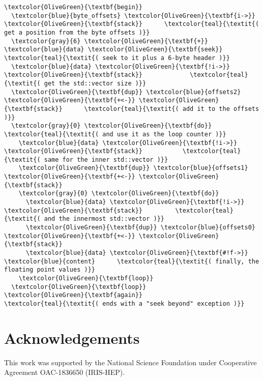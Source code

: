 \documentclass{webofc}
\begin{document}
\begin{Verbatim}[commandchars=\\\{\}]
\textcolor{OliveGreen}{\textbf{begin}}
  \textcolor{blue}{byte_offsets} \textcolor{OliveGreen}{\textbf{i->}} \textcolor{OliveGreen}{\textbf{stack}}      \textcolor{teal}{\textit{( get a position from the byte offsets )}}
  \textcolor{gray}{6} \textcolor{OliveGreen}{\textbf{+}} \textcolor{blue}{data} \textcolor{OliveGreen}{\textbf{seek}}               \textcolor{teal}{\textit{( seek to it plus a 6-byte header )}}
  \textcolor{blue}{data} \textcolor{OliveGreen}{\textbf{!i->}} \textcolor{OliveGreen}{\textbf{stack}}             \textcolor{teal}{\textit{( get the std::vector size )}}
  \textcolor{OliveGreen}{\textbf{dup}} \textcolor{blue}{offsets2} \textcolor{OliveGreen}{\textbf{+<-}} \textcolor{OliveGreen}{\textbf{stack}}      \textcolor{teal}{\textit{( add it to the offsets )}}
  \textcolor{gray}{0} \textcolor{OliveGreen}{\textbf{do}}                        \textcolor{teal}{\textit{( and use it as the loop counter )}}
    \textcolor{blue}{data} \textcolor{OliveGreen}{\textbf{!i->}} \textcolor{OliveGreen}{\textbf{stack}}           \textcolor{teal}{\textit{( same for the inner std::vector )}}
    \textcolor{OliveGreen}{\textbf{dup}} \textcolor{blue}{offsets1} \textcolor{OliveGreen}{\textbf{+<-}} \textcolor{OliveGreen}{\textbf{stack}}
    \textcolor{gray}{0} \textcolor{OliveGreen}{\textbf{do}}
      \textcolor{blue}{data} \textcolor{OliveGreen}{\textbf{!i->}} \textcolor{OliveGreen}{\textbf{stack}}         \textcolor{teal}{\textit{( and the innermost std::vector )}}
      \textcolor{OliveGreen}{\textbf{dup}} \textcolor{blue}{offsets0} \textcolor{OliveGreen}{\textbf{+<-}} \textcolor{OliveGreen}{\textbf{stack}}
      \textcolor{blue}{data} \textcolor{OliveGreen}{\textbf{#!f->}} \textcolor{blue}{content}      \textcolor{teal}{\textit{( finally, the floating point values )}}
    \textcolor{OliveGreen}{\textbf{loop}}
  \textcolor{OliveGreen}{\textbf{loop}}
\textcolor{OliveGreen}{\textbf{again}}                         \textcolor{teal}{\textit{( ends with a "seek beyond" exception )}}
\end{Verbatim}

\section{Acknowledgements}

This work was supported by the National Science Foundation under Cooperative Agreement OAC-1836650 (IRIS-HEP).






\end{document}
